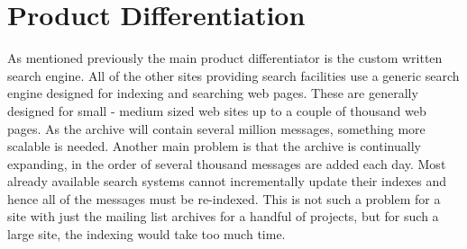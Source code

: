 \section{Product Differentiation}
As mentioned previously the main product differentiator is the custom
written search engine.  All of the other sites providing search facilities
use a generic search engine designed for indexing and searching web pages.
These are generally designed for small - medium sized web sites up to a
couple of thousand web pages.  As the archive will contain several million
messages, something more scalable is needed.  Another main problem is that
the archive is continually expanding, in the order of several thousand
 messages are
added each day.  Most already available search systems cannot
incrementally update their indexes and hence all of the messages must be
re-indexed.  This is not such a problem for a site with just the mailing
list archives for a handful of projects, but for such a large site, the
indexing would take too much time.


